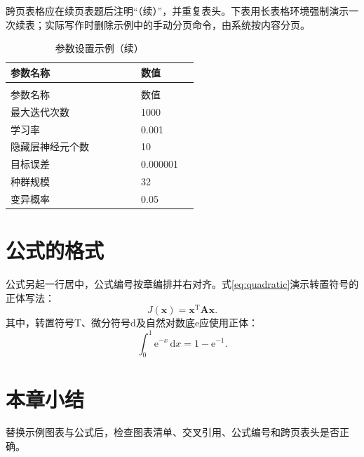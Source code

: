 跨页表格应在续页表题后注明“（续）”，并重复表头。下表用长表格环境强制演示一次续表；实际写作时删除示例中的手动分页命令，由系统按内容分页。

\begin{thesistable}
\begin{longtable}{p{0.58\linewidth}p{0.25\linewidth}}
  \caption{参数设置示例}\label{tab:long}\\
  \toprule 参数名称&数值\\\midrule
  \endfirsthead
  \caption[]{参数设置示例（续）}\\
  \toprule 参数名称&数值\\\midrule
  \endhead
  \bottomrule\endfoot
  \bottomrule\endlastfoot
  最大迭代次数&1000\\
  学习率&0.001\\
  隐藏层神经元个数&10\\
  目标误差&0.000001\\
  \pagebreak
  种群规模&32\\
  变异概率&0.05\\
\end{longtable}
\end{thesistable}
\section{公式的格式}
公式另起一行居中，公式编号按章编排并右对齐。式\eqref{eq:quadratic}演示转置符号的正体写法：
\begin{equation}
  J(\symbf{x})=\symbf{x}^{\mathrm{T}}\symbf{A}\symbf{x}.
  \label{eq:quadratic}
\end{equation}
其中，转置符号T、微分符号d及自然对数底e应使用正体：
\begin{equation}
  \int_0^1 \mathrm{e}^{-x}\,\mathrm{d}x=1-\mathrm{e}^{-1}.
\end{equation}
\section{本章小结}
替换示例图表与公式后，检查图表清单、交叉引用、公式编号和跨页表头是否正确。
